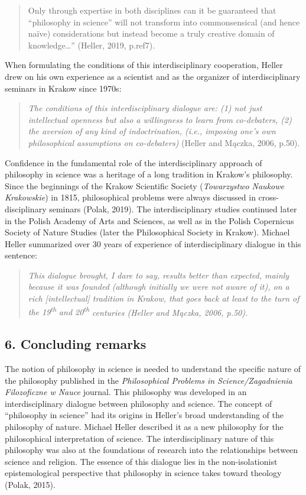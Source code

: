 \documentclass[a4paper]{article}
\begin{document}
\begin{quotation}
Only through expertise in both disciplines can it be guaranteed that “philosophy in science” will not transform into
commonsensical (and hence naïve) considerations but instead become a truly creative domain of knowledge…” (Heller,
2019, p.ref7).

\end{quotation}
When formulating the conditions of this interdisciplinary cooperation, Heller drew on his own experience as a scientist
and as the organizer of interdisciplinary seminars in Krakow since 1970s:

\begin{quotation}
\textit{The conditions of this interdisciplinary dialogue are: (1) not just intellectual openness but also a willingness
to learn from co-debaters, (2) the aversion of any kind of indoctrination, (i.e., imposing one’s own philosophical
assumptions on co-debaters)} (Heller and Mączka, 2006, p.50).

\end{quotation}
Confidence in the fundamental role of the interdisciplinary approach of philosophy in science was a heritage of a long
tradition in Krakow’s philosophy. Since the beginnings of the Krakow Scientific Society (\textit{Towarzystwo Naukowe
Krakowskie}) in 1815, philosophical problems were always discussed in cross-disciplinary seminars (Polak, 2019). The
interdisciplinary studies continued later in the Polish Academy of Arts and Sciences, as well as in the Polish
Copernicus Society of Nature Studies (later the Philosophical Society in Krakow). Michael Heller summarized over 30
years of experience of interdisciplinary dialogue in this sentence:

\begin{quotation}
\textit{This dialogue brought, I dare to say, results better than expected, mainly because it was founded (although
initially we were not aware of it), on a rich [intellectual] tradition in Krakow, that goes back at least to the turn
of the 19}\textit{\textsuperscript{th}}\textit{ and 20}\textit{\textsuperscript{th}}\textit{ centuries (Heller and
Mączka, 2006, p.50).}

\end{quotation}
\subsection{6. Concluding remarks}
The notion of philosophy in science is needed to understand the specific nature of the philosophy published in the
\textit{Philosophical Problems in Science/Zagadnienia Filozoficzne w Nauce} journal. This philosophy was developed in
an interdisciplinary dialogue between philosophy and science. The concept of “philosophy in science” had its origins in
Heller’s broad understanding of the philosophy of nature. Michael Heller described it as a new philosophy for the
philosophical interpretation of science. The interdisciplinary nature of this philosophy was also at the foundations of
research into the relationships between science and religion. The essence of this dialogue lies in the non-isolationist
epistemological perspective that philosophy in science takes toward theology (Polak, 2015).
\end{document}
